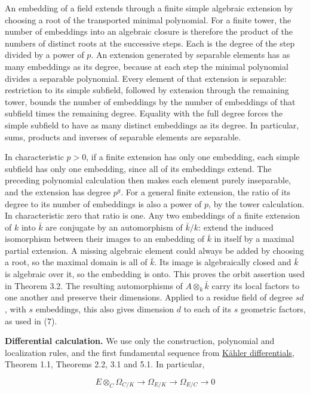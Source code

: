 \documentclass[
]{article}
\begin{document}
An embedding of a field extends through a finite simple algebraic
extension by choosing a root of the transported minimal polynomial. For
a finite tower, the number of embeddings into an algebraic closure is
therefore the product of the numbers of distinct roots at the successive
steps. Each is the degree of the step divided by a power of \(p\). An
extension generated by separable elements has as many embeddings as its
degree, because at each step the minimal polynomial divides a separable
polynomial. Every element of that extension is separable: restriction to
its simple subfield, followed by extension through the remaining tower,
bounds the number of embeddings by the number of embeddings of that
subfield times the remaining degree. Equality with the full degree
forces the simple subfield to have as many distinct embeddings as its
degree. In particular, sums, products and inverses of separable elements
are separable.

In characteristic \(p>0\), if a finite extension has only one embedding,
each simple subfield has only one embedding, since all of its embeddings
extend. The preceding polynomial calculation then makes each element
purely inseparable, and the extension has degree \(p^g\). For a general
finite extension, the ratio of its degree to its number of embeddings is
also a power of \(p\), by the tower calculation. In characteristic zero
that ratio is one. Any two embeddings of a finite extension of \(k\)
into \(\bar k\) are conjugate by an automorphism of \(\bar k/k\): extend
the induced isomorphism between their images to an embedding of
\(\bar k\) in itself by a maximal partial extension. A missing algebraic
element could always be added by choosing a root, so the maximal domain
is all of \(\bar k\). Its image is algebraically closed and \(\bar k\)
is algebraic over it, so the embedding is onto. This proves the orbit
assertion used in Theorem 3.2. The resulting automorphisms of
\(A\otimes_k\bar k\) carry its local factors to one another and preserve
their dimensions. Applied to a residue field of degree \(sd\), with
\(s\) embeddings, this also gives dimension \(d\) to each of its \(s\)
geometric factors, as used in (7).

\textbf{Differential calculation.} We use only the construction,
polynomial and localization rules, and the first fundamental sequence
from \href{../prerequisites/AG-CA/AG-CA-16.html}{Kähler differentials},
Theorem 1.1, Theorems 2.2, 3.1 and 5.1. In particular,

\[
E\otimes_C\Omega_{C/K}\longrightarrow\Omega_{E/K}
\longrightarrow\Omega_{E/C}\longrightarrow0
\]
\end{document}
